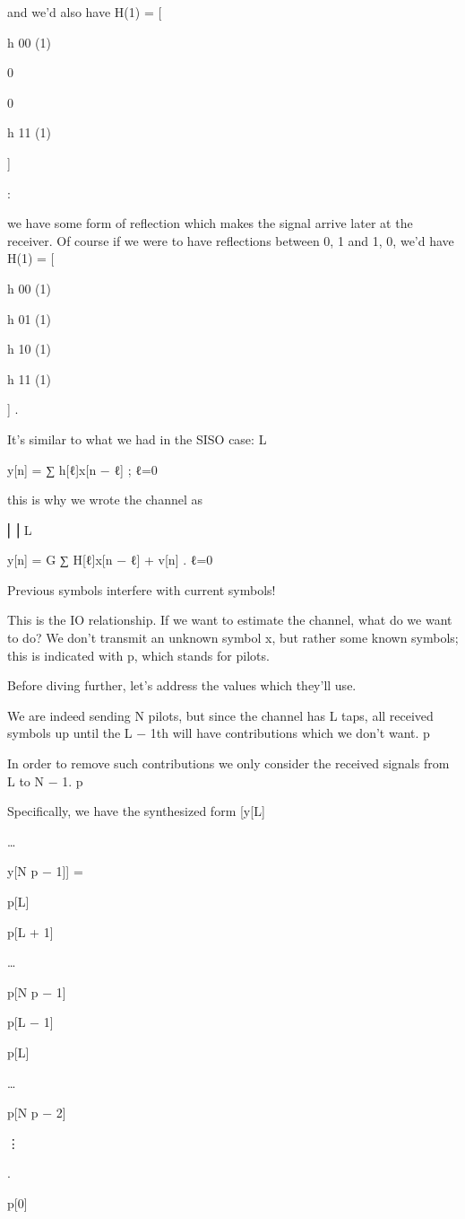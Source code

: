 {{{and we'd also have H(1) = [

h 00 (1)

0

0

h 11 (1)

]

:

we have some form of reflection which makes the signal arrive later at the receiver.
Of course if we were to have reflections between 0, 1 and 1, 0, we'd have H(1) = [

h 00 (1)

h 01 (1)

h 10 (1)

h 11 (1)

] .

It's similar to what we had in the SISO case:
L

y[n] = ∑ h[ℓ]x[n − ℓ] ;
ℓ=0

this is why we wrote the channel as

⎢⎥
L

y[n] = \sqrt G ∑ H[ℓ]x[n − ℓ] + v[n] .
ℓ=0

Previous symbols interfere with current symbols!

This is the IO relationship. If we want to estimate the channel, what do we want to do?
We don't transmit an unknown symbol x, but rather some known symbols; this is indicated with p, which stands for pilots.

Before diving further, let's address the values which they'll use.

We are indeed sending N pilots, but since the channel has L taps, all received symbols up until the L − 1th will have contributions which we don't want.
p

In order to remove such contributions we only consider the received signals from L to N − 1.
p

Specifically, we have the synthesized form
[y[L]

…

y[N p − 1]] =

p[L]

p[L + 1]

…

p[N p − 1]

p[L − 1]

p[L]

…

p[N p − 2]

⋮

.

p[0]

}}}
